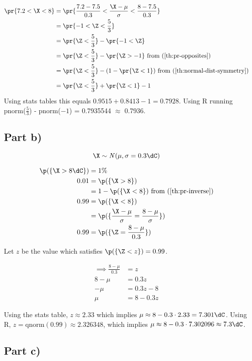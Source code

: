 \begin{align*}
\pr{7.2 < \X < 8} &= \pr{\frac{7.2 - 7.5}{0.3} < \frac{\X - \mu}{\sigma} < \frac{8 - 7.5}{0.3}} \\
&= \pr{-1 < \Z < \frac{5}{3}} \\
&= \pr{\Z < \frac{5}{3}} - \pr{-1 < \Z} \\
&= \pr{\Z < \frac{5}{3}} - \pr{\Z > -1}
\text{	from (\ref{th:pr-opposites})} \\
&= \pr{\Z < \frac{5}{3}} - (1 - \pr{\Z < 1})
\text{	from (\ref{th:normal-dist-symmetry})} \\
&= \pr{\Z < \frac{5}{3}} + \pr{\Z < 1} - 1
\end{align*}
Using stats tables this equals $0.9515 + 0.8413 - 1 = 0.7928$.
Using R running pnorm($\frac{5}{3}$) - pnorm($-1$) = 0.7935544 $\approx$ 0.7936.

\subsection{Part b)}

\[
\X \sim \mathit{N}(\mu, \sigma = 0.3 \dC)
\]

\begin{align*}
\p(\{ \X > 8\dC \}) &= 1\% \\
0.01 &= \p(\{ \X > 8 \}) \\
&= 1 - \p(\{ \X < 8 \})
\text{	from (\ref{th:pr-inverse})} \\
0.99 &= \p(\{ \X < 8 \}) \\
&= \p(\{ \frac{\X - \mu}{\sigma} = \frac{8 - \mu}{\sigma}\}) \\
0.99 &= \p(\{ \Z = \frac{8 - \mu}{0.3}\}) \\
\end{align*}

Let $z$ be the value which satisfies $\p(\{ \Z < z \}) = 0.99$.

\begin{align*}
\implies \frac{8 - \mu}{0.3} &= z \\
8 - \mu &= 0.3z \\
-\mu &= 0.3z - 8 \\
\mu &= 8 - 0.3z
\end{align*}

Using the stats table, $z \approx 2.33$ which implies $\mu \approx 8 - 0.3 \cdot 2.33 = 7.301\dC$.
Using R, $z = \text{qnorm}(0.99) \approx 2.326348$, which implies $\mu \approx 8 - 0.3 \cdot 7.302096 \approx 7.3\dC$.

\subsection{Part c)}

